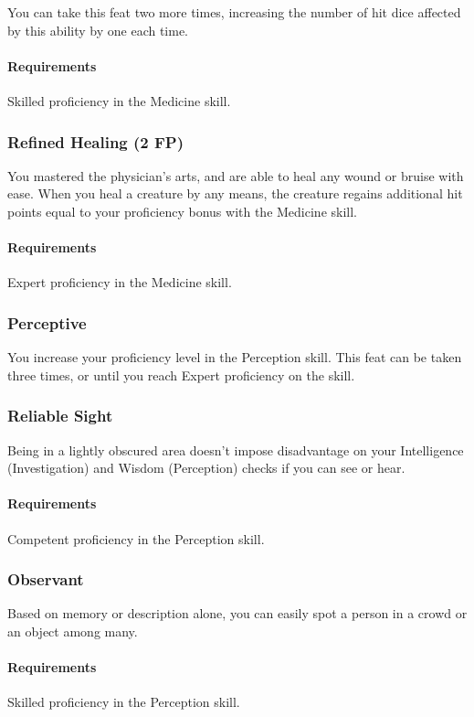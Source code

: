     You can take this feat two more times, increasing the number of hit dice affected by this ability by one each time.
    \paragraph{Requirements} Skilled proficiency in the Medicine skill.
\subsubsection{Refined Healing (2 FP)} \label{feat::refinedhealing}
    You mastered the physician's arts, and are able to heal any wound or bruise with ease.
    When you heal a creature by any means, the creature regains additional hit points equal to your proficiency bonus with the Medicine skill.
    \paragraph{Requirements} Expert proficiency in the Medicine skill.
\subsubsection{Perceptive} \label{feat::perceptive}
    You increase your proficiency level in the Perception skill.
    This feat can be taken three times, or until you reach Expert proficiency on the skill.
\subsubsection{Reliable Sight} \label{feat::reliablesight}
    Being in a lightly obscured area doesn't impose disadvantage on your Intelligence (Investigation) and Wisdom (Perception) checks if you can see or hear.
    \paragraph{Requirements} Competent proficiency in the Perception skill.
\subsubsection{Observant} \label{feat::observant}
    Based on memory or description alone, you can easily spot a person in a crowd or an object among many.
    \paragraph{Requirements} Skilled proficiency in the Perception skill.
